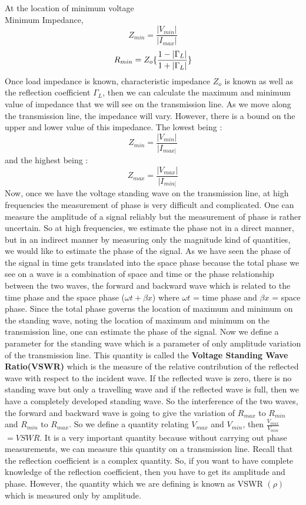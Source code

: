 At the location of minimum voltage\\
Minimum Impedance,
\begin{equation}
Z_{min}=\frac{|V_{min}|}{|I_{max}|}
\end{equation}
\begin{equation}
\\R_{min} =Z_o\{\frac{1-|\Gamma_L|}{1+|\Gamma_L|}\}
\end{equation}
Once load impedance is known, characteristic impedance $Z_o$ is known as well as the reflection coefficient $\Gamma_L$, then we can calculate the maximum and minimum value of impedance that we will see on the transmission line. As we move along the transmission line, the impedance will vary. However, there is a bound on the upper and lower value of this impedance. The lowest being :
\begin{equation*}
Z_{min} = \frac{|V_{min}|}{|I_{max|}}
\end{equation*}
and the highest being :
\begin{equation*}
Z_{max} = \frac{|V_{max}|}{|I_{min|}}
\end{equation*}
Now, once we have the voltage standing wave on the transmission line, at high frequencies the measurement of phase is very difficult and complicated. One can measure the amplitude of a signal reliably but the measurement of phase is rather uncertain. So at high frequencies, we estimate the phase not in a direct manner, but in an indirect manner by measuring only the magnitude kind of quantities, we would like to estimate the phase of the signal. As we have seen the phase of the signal in time gets translated into the space phase because the total phase we see on a wave is a combination of space and time or the phase relationship between the two waves, the forward and backward wave which is related to the time phase and the space phase ($\omega t + \beta x$) where $\omega t$ = time phase and $\beta x$ = space phase. Since the total phase governs the location of maximum and minimum on the standing wave, noting the location of maximum and minimum on the transmission line, one can estimate the phase of the signal. Now we define a parameter for the standing wave which is a parameter of only amplitude variation of the transmission line. This quantity is called the \textbf{Voltage Standing Wave Ratio(VSWR)} which is the measure of the relative contribution of the reflected wave with respect to the incident wave. If the reflected wave is zero, there is no standing wave but only a travelling wave and if the reflected wave is full, then we have a completely developed standing wave. So the interference of the two waves, the forward and backward wave is going to give the variation of $R_{max}$ to $R_{min}$ and $R_{min}$ to $R_{max}$. So we define a quantity relating $V_{max}$ and $V_{min}$, then $\frac{V_{max}}{V_{min}}$ $= VSWR$. It is a very important quantity because without carrying out phase measurements, we can measure this quantity on a transmission line. Recall that the reflection coefficient is a complex quantity. So, if you want to have complete knowledge of the reflection coefficient, then you have to get its amplitude and phase. However, the quantity which we are defining is known as VSWR $(\rho)$ which is measured only by amplitude.\\
